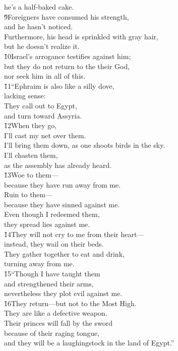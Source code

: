 \begin{poetry}
\poemll    he's a half-baked cake. \\
\poeml \v{9}Foreigners have consumed his strength, \\
\poemll    and he hasn't noticed. \\
\poeml Furthermore, his head is sprinkled with gray hair, \\
\poemll    but he doesn't realize it. \\
\poeml \v{10}Israel's arrogance testifies against him; \\
\poemll    but they do not return to the  their God, \\
\poemlll       nor seek him in all of this. \\
\poeml \v{11}``Ephraim is also like a silly dove, \\
\poemll    lacking sense: \\
\poeml They call out to Egypt, \\
\poemll    and turn toward Assyria. \\
\poeml \v{12}When they go, \\
\poemll    I'll cast my net over them. \\
\poeml I'll bring them down, as one shoots birds in the sky. \\
\poemll    I'll chasten them, \\
\poemlll       as the assembly has already heard. \\
\poeml \v{13}Woe to them--- \\
\poemll    because they have run away from me. \\
\poeml Ruin to them--- \\
\poemll    because they have sinned against me. \\
\poeml Even though I redeemed them, \\
\poemll    they spread lies against me. \\
\poeml \v{14}They will not cry to me from their heart--- \\
\poemll    instead, they wail on their beds. \\
\poeml They gather together to eat and drink, \\
\poemll    turning away from me. \\
\poeml \v{15}``Though I have taught them \\
\poemll    and strengthened their arms, \\
\poemlll       nevertheless they plot evil against me. \\
\poeml \v{16}They return---but not to the Most High. \\
\poemll    They are like a defective weapon. \\
\poeml Their princes will fall by the sword \\
\poemll    because of their raging tongue, \\
\poemlll       and they will be a laughingstock in the land of Egypt.''
\end{poetry}

